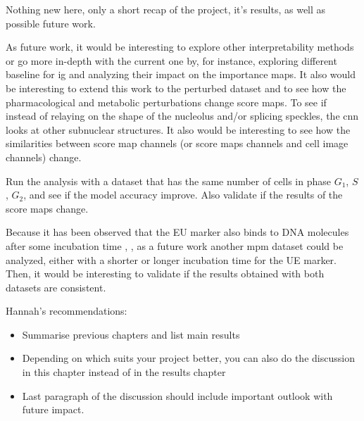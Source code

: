 
\glsresetall

Nothing new here, only a short recap of the project, it's results, as well as possible future work.

As future work, it would be interesting to explore other interpretability  methods or go more in-depth with the current one by, for instance, exploring different baseline for \acrlong{ig} and analyzing their impact on the importance maps.
It also would be interesting to extend this work to the perturbed dataset and to see how the pharmacological and metabolic perturbations change score maps. To see if instead of relaying on the shape of the nucleolus and/or splicing speckles, the \gls{cnn} looks at other subnuclear structures. It also would be interesting to see how the similarities between score map channels (or score maps channels and cell image channels) change.

Run the analysis with a dataset that has the same number of cells in phase $G_1$, $S$, $G_2$, and see if the model accuracy improve. Also validate if the results of the score maps change.

Because it has been observed that the EU marker also binds to DNA molecules after some incubation time \cite{jao2008exploring}, \cite{bao2018capturing}, as a future work another \gls{mpm} dataset could be analyzed, either with a shorter or longer incubation time for the UE marker. Then, it would be interesting to validate if the results obtained with both datasets are consistent.

Hannah's recommendations:
\begin{itemize}
  \item Summarise previous chapters and list main results
  \item Depending on which suits your project better, you can also do the discussion in this chapter instead of in the results chapter
  \item Last paragraph of the discussion should include important outlook with future impact.
\end{itemize}
